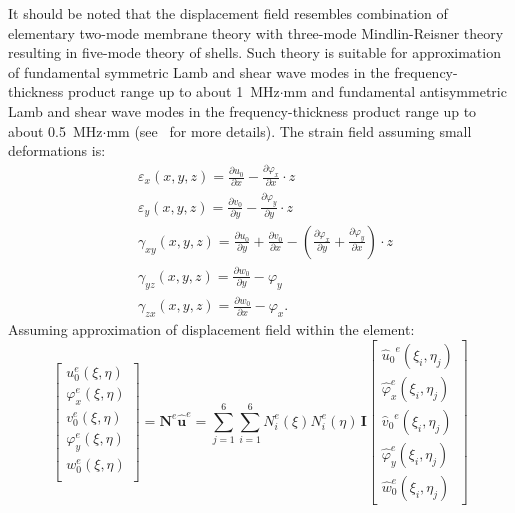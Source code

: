 \documentclass[preprint,12pt]{elsarticle}
\renewcommand{\vec}[1]{\mathbf{#1}}
\renewcommand{\bm}[1]{\mathbf{#1}}
\begin{document}
	It should be noted that the displacement field resembles combination of elementary two-mode membrane theory with three-mode Mindlin-Reisner theory resulting in five-mode theory of shells. Such theory is suitable for approximation of fundamental symmetric Lamb and shear wave modes in the frequency-thickness product range up to about 1~MHz$\cdot$mm and  fundamental antisymmetric Lamb and shear wave modes in the frequency-thickness product range up to about 0.5~MHz$\cdot$mm (see~\cite{Ostachowicz2012} for more details).
	The strain field assuming small deformations is:
	\begin{equation}
	\begin{split}
	& \varepsilon_x(x,y,z)= \frac{\partial u_0}{\partial x} - \frac{\partial \varphi_x}{\partial x} \cdot z\\
	& \varepsilon_y(x,y,z)=\frac{\partial v_0}{\partial y} - \frac{\partial \varphi_y}{\partial y} \cdot z\\
	& \gamma_{xy}(x,y,z)= \frac{\partial u_0}{\partial y} +  \frac{\partial v_0}{\partial x} - \left( \frac{\partial \varphi_x}{\partial y} + \frac{\partial \varphi_y}{\partial x}\right)\cdot z\\
	& \gamma_{yz}(x,y,z)= \frac{\partial w_0}{\partial y} - \varphi_y\\
	& \gamma_{zx}(x,y,z)= \frac{\partial w_0}{\partial x} - \varphi_x .
	\label{eq:delam_platestrains}
	\end{split}
	\end{equation}
	Assuming approximation of displacement field within the element:
	\begin{equation}
	\left[\begin{array}{l} u_0^e(\xi, \eta) \\ \varphi_x^e(\xi, \eta)\\ v_0^e(\xi, \eta) \\ \varphi_y^e(\xi, \eta)\\ w_0^e(\xi, \eta)\\ \end{array}\right] = \bm{N}^e \vec{\hat{u}}^e = \sum \limits_{j=1}^{6} \sum \limits_{i=1}^{6} N^e_i(\xi) N^e_i(\eta)\, \bm{I} \left[ \begin{array}{l} {\hat{u}_0}^e(\xi_i,\eta_j)\\\hat{\varphi}_x^e(\xi_i,\eta_j)\\{\hat{v}_0}^e(\xi_i,\eta_j) \\\hat{\varphi}_y^e(\xi_i,\eta_j) \\ \hat{w}_0^e(\xi_i,\eta_j)\end{array} \right] \label{eq:delam_plateaproxim}
	\end{equation}  
\end{document}
